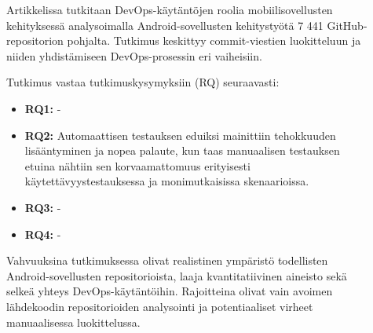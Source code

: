 \documentclass[bscthesis,finnish,oneside,biblatex]{uefcsthesis}
\begin{document}
    \begin{description}
        \item[\cite{eramo2024empirical}] Artikkelissa tutkitaan DevOps-käytäntöjen roolia mobiilisovellusten kehityksessä analysoimalla Android-sovellusten kehitystyötä 7 441 GitHub-repositorion pohjalta. Tutkimus keskittyy commit-viestien luokitteluun ja niiden yhdistämiseen DevOps-prosessin eri vaiheisiin.

        Tutkimus vastaa tutkimuskysymyksiin (RQ) seuraavasti:
        \begin{itemize}
            \item \textbf{RQ1:} -
            \item \textbf{RQ2:} Automaattisen testauksen eduiksi mainittiin tehokkuuden lisääntyminen ja nopea palaute, kun taas manuaalisen testauksen etuina nähtiin sen korvaamattomuus erityisesti käytettävyystestauksessa ja monimutkaisissa skenaarioissa.
            \item \textbf{RQ3:} -
            \item \textbf{RQ4:} -
        \end{itemize}

        Vahvuuksina tutkimuksessa olivat realistinen ympäristö todellisten Android-sovellusten repositorioista, laaja kvantitatiivinen aineisto sekä selkeä yhteys DevOps-käytäntöihin. Rajoitteina olivat vain avoimen lähdekoodin repositorioiden analysointi ja potentiaaliset virheet manuaalisessa luokittelussa.
    \end{description}
\end{document}
